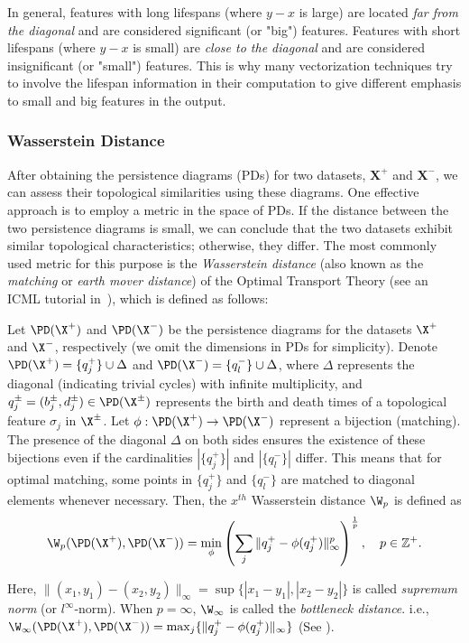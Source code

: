 In general, features with long lifespans (where $y - x$ is large) are located \textit{far from the diagonal} and are considered significant (or "big") features. Features with short lifespans (where $y - x$ is small) are \textit{close to the diagonal} and are considered insignificant (or "small") features. This is why many vectorization techniques try to involve the lifespan information in their computation to give different emphasis to small and big features in the output.

\subsubsection{Wasserstein Distance} \label{sec:wasserstein}

After obtaining the persistence diagrams (PDs) for two datasets, $\mathbf{X}^+$ and $\mathbf{X}^-$, we can assess their topological similarities using these diagrams. One effective approach is to employ a metric in the space of PDs. If the distance between the two persistence diagrams is small, we can conclude that the two datasets exhibit similar topological characteristics; otherwise, they differ.
The most commonly used metric for this purpose is the \textit{Wasserstein distance} (also known as the \textit{matching} or \textit{earth mover distance}) of the Optimal Transport Theory (see an ICML tutorial in~\cite{bunne2023optimal}), which is defined as follows:

Let $\PD(\X^+)$ and $\PD(\X^-)$ be the persistence diagrams for the datasets $\X^+$ and $\X^-$, respectively (we omit the dimensions in PDs for simplicity). Denote $\PD(\X^+) = \{q_j^+\} \cup \Delta$ and $\PD(\X^-) = \{q_l^-\} \cup \Delta$, where $\Delta$ represents the diagonal (indicating trivial cycles) with infinite multiplicity, and $q_j^\pm = (b^\pm_j, d_j^\pm) \in \PD(\X^\pm)$ represents the birth and death times of a topological feature $\sigma_j$ in $\X^\pm$. Let $\phi: \PD(\X^+) \to \PD(\X^-)$ represent a bijection (matching). The presence of the diagonal $\Delta$ on both sides ensures the existence of these bijections even if the cardinalities $|\{q_j^+\}|$ and $|\{q_l^-\}|$ differ. This means that for optimal matching, some points in $\{q_j^+\}$ and $\{q_l^-\}$ are matched to diagonal elements whenever necessary. Then, the $x^{th}$ Wasserstein distance $\W_p$ is defined as
\[
\W_p(\PD(\X^+), \PD(\X^-)) = \min_{\phi} \left( \sum_j \|q_j^+ - \phi(q_j^+)\|_\infty^p \right)^{\frac{1}{p}}, \quad p \in \mathbb{Z}^+.
\]

Here, $\|(x_1,y_1)-(x_2,y_2)\|_\infty=\sup \{|x_1-y_1|,|x_2-y_2|\}$ is called {\em supremum norm} (or $l^\infty$-norm). When $p=\infty$, $\W_\infty$ is called the {\em bottleneck distance}. i.e.,
$\W_\infty(\PD(\X^+), \PD(\X^-)) = \max_j \{\|q_j^+ - \phi(q_j^+)\|_\infty\}$ (See ).



